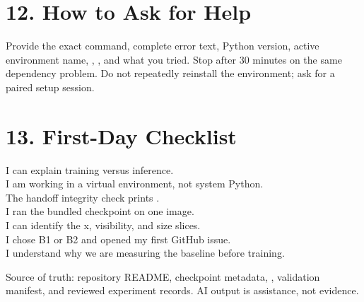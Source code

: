 \documentclass[11pt]{article}
\begin{document}
\section{12. How to Ask for Help}

Provide the exact command, complete error text, Python version, active environment name, , , and what you tried. Stop after 30 minutes on the same dependency problem. Do not repeatedly reinstall the environment; ask for a paired setup session.

\section{13. First-Day Checklist}

\checkbox I can explain training versus inference.\\
\checkbox I am working in a virtual environment, not system Python.\\
\checkbox The handoff integrity check prints \good.\\
\checkbox I ran the bundled checkpoint on one image.\\
\checkbox I can identify the x, visibility, and size slices.\\
\checkbox I chose B1 or B2 and opened my first GitHub issue.\\
\checkbox I understand why we are measuring the baseline before training.

\vfill
{\small\color{navy}Source of truth: repository README, checkpoint metadata, , validation manifest, and reviewed experiment records. AI output is assistance, not evidence.}
\end{document}
